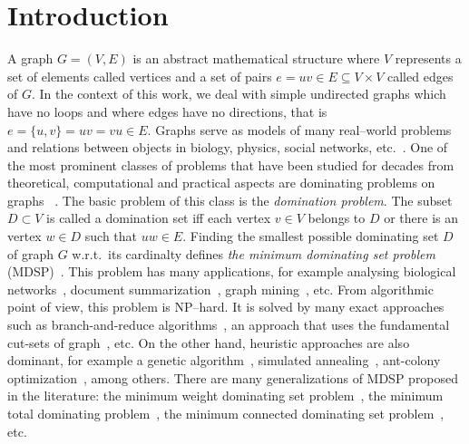 \documentclass[sigconf]{acmart}
\begin{document}
\section{Introduction}
A graph $G=(V,E)$ is an abstract mathematical structure 
where $V$ represents a set of elements called vertices and   a set of pairs $e = uv  \in E \subseteq V \times V$ called edges of $G$. In the context of this work, we deal with  simple undirected graphs which have no loops and where edges have no directions, that is $e = \{u,v\}  = uv = vu \in E$.   Graphs serve as models of many real--world problems and relations between objects in biology, physics, social networks,  etc.~\cite{mashaghi2004investigation,pirzada2007applications,shah2019characterizing,doi:10.1137/S0895480100375831}. One of the most prominent classes of problems that have been studied for decades from theoretical, computational and practical aspects are dominating problems on graphs~ \cite{haynes2013fundamentals}. The basic problem of this class is the \textit{domination problem}. The subset $D \subset V$ is called a domination set iff each vertex $v\in V$ belongs to $D$ or there is an vertex $w\in D$ such that $uw\in E$. Finding the smallest possible dominating set $D$ of graph $G$ w.r.t.\ its cardinalty defines \emph{the minimum dominating set problem} (MDSP)~\cite{grandoni2006note}. This problem has many applications, for example analysing biological networks~\cite{nacher2016minimum}, document summarization~\cite{shen2010multi}, graph mining~\cite{chalupa2018order},  etc. From algorithmic point of view, this problem is NP--hard. It is solved by many exact approaches such as branch-and-reduce algorithms~\cite{van2011exact}, an approach that uses the fundamental cut-sets of graph~\cite{karci2020new}, etc. On the other hand, heuristic approaches are also dominant, for example a genetic algorithm~\cite{hedar2010hybrid}, simulated annealing~\cite{hedar2012simulated}, ant-colony optimization~\cite{ho2006enhanced}, among others. There are many generalizations of MDSP proposed in the literature:  the minimum weight dominating set problem~\cite{romania2010ant}, the minimum total dominating problem~\cite{yuan2019novel}, the minimum connected dominating set problem~\cite{butenko2004new}, etc.
\end{document}

